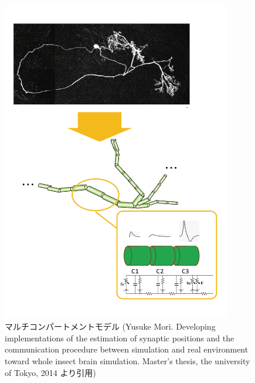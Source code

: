 \begin{figure}[htb]
 \begin{center}
    \includegraphics[width=10cm]{./images/multi-compartment.pdf}
    \caption[マルチコンパートメントモデル]{マルチコンパートメントモデル (Yusuke Mori. Developing implementations of the estimation of synaptic positions and the communication procedure between simulation and real environment toward whole insect brain simulation. Master's thesis, the university of Tokyo, 2014\cite{mori-master} より引用)}
    \label{fig:multi-compartment}
 \end{center}
\end{figure}
\clearpage
